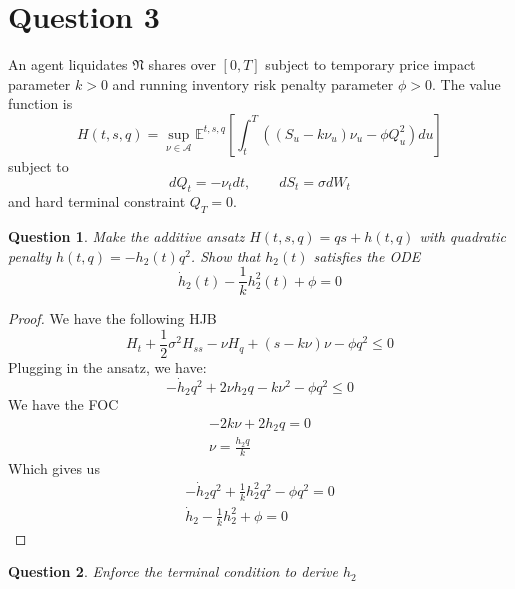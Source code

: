 \documentclass{amsart}
\newtheorem{theorem}{Question}[section]
\newcommand{\EE}{\mathbb{E}}
\begin{document}
\section{Question 3}
An agent liquidates $\mathfrak{N}$ shares over $[0, T]$ subject to temporary price impact parameter $k > 0$
and running inventory risk penalty parameter $\phi > 0$.
The value function is 
\[
H(t, s, q) = \sup_{\nu \in \mathcal{A}}\EE^{t,s,q} \left[
    \int_t^T ((S_u - k \nu_u) \nu_u - \phi Q_u^2) du
\right]
\]
subject to 
\[
dQ_t = -\nu_t dt, \qquad dS_t = \sigma d W_t
\]
and hard terminal constraint $Q_T = 0$. 
\begin{theorem}
    Make the additive ansatz $H(t, s, q) = qs + h(t,q)$ with quadratic penalty $h(t,q) = -h_2(t)q^2$. 
    Show that $h_2(t)$ satisfies the ODE
    \[
    \dot{h}_2(t) - \frac1{k} h_2^2(t) + \phi = 0
    \]
\end{theorem}
\begin{proof}
    We have the following HJB
    \[
    H_t + \frac{1}{2}\sigma^2 H_{ss} - \nu H_q + (s - k\nu)\nu - \phi q^2 \le 0
    \]
    Plugging in the ansatz, we have: 
    \[
    -\dot{h}_2q^2 + 2\nu h_2 q  - k \nu^2 - \phi q^2 \le 0
    \]
    We have the FOC
    \begin{align*}
        -2k \nu + 2h_2q = 0 \\
        \nu = \frac{h_2 q}{k}
    \end{align*}
    Which gives us 
    \begin{align*}
    -\dot{h}_2 q^2 + \frac{1}{k}h_2^2 q^2  - \phi q^2 = 0\\
    \dot{h}_2 - \frac{1}{k}h_2^2 + \phi = 0
    \end{align*}
\end{proof}
\begin{theorem}
    Enforce the terminal condition to derive $h_2$
\end{theorem}
\end{document}
